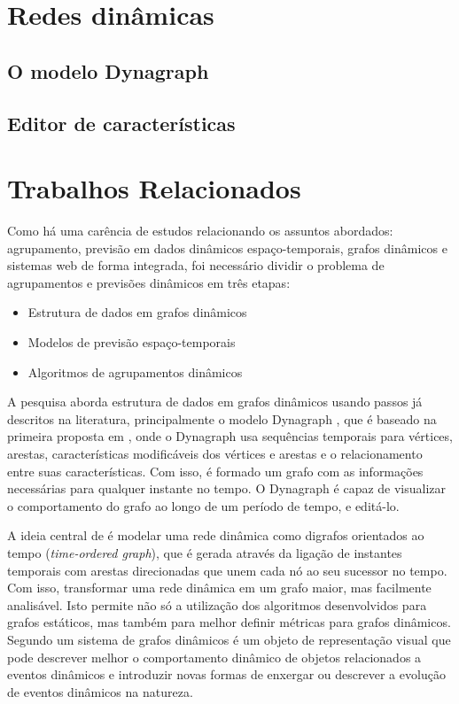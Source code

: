 \section{Redes dinâmicas}
 \label{redes-dinamicas} 
\subsection{O modelo Dynagraph}
\subsection{Editor de características}
\section{Trabalhos Relacionados}
 \label{trabalhos-relacionados} 
Como há uma carência de estudos relacionando os assuntos abordados: agrupamento,
previsão em dados dinâmicos espaço-temporais, grafos dinâmicos e sistemas web
de forma integrada, foi necessário dividir o problema de agrupamentos e previsões dinâmicos em três etapas:
\begin{itemize}
\item Estrutura de dados em grafos dinâmicos
\item Modelos de previsão espaço-temporais
\item Algoritmos de agrupamentos dinâmicos
\end{itemize}

A pesquisa aborda estrutura de dados em grafos dinâmicos usando passos já descritos na literatura,
principalmente o modelo Dynagraph \cite{dynagraph}, que é baseado na primeira proposta
em \cite{dynagraph2012}, onde o Dynagraph usa sequências temporais para vértices, arestas,
características modificáveis dos vértices e arestas e o relacionamento entre suas características.
Com isso, é formado um grafo com as informações necessárias para qualquer instante no tempo.
O Dynagraph é capaz de visualizar o comportamento do grafo ao longo de um período de tempo,
e editá-lo.

A ideia central de \cite{kim} é modelar uma rede dinâmica como digrafos orientados ao
tempo (\textit{time-ordered graph}), que é gerada através da ligação de instantes temporais com arestas
direcionadas que unem cada nó ao seu sucessor no tempo. Com isso, transformar uma rede dinâmica
em um grafo maior, mas facilmente analisável. Isto permite não só a utilização dos algoritmos 
desenvolvidos para grafos estáticos, mas também para melhor definir métricas para grafos dinâmicos.
Segundo \cite{kim} um sistema de grafos dinâmicos é um objeto de representação visual
que pode descrever melhor o comportamento dinâmico de objetos relacionados a eventos dinâmicos e
introduzir novas formas de enxergar ou descrever a evolução de eventos dinâmicos na natureza.

